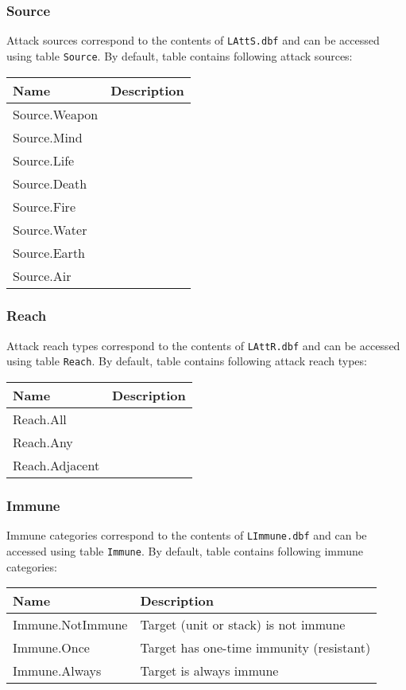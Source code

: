 \subsubsection{Source}
\label{SourceCategory}
Attack sources correspond to the contents of \texttt{LAttS.dbf} and can be accessed using table \texttt{Source}.
By default, table contains following attack sources:\\
\begin{tabularx}{\linewidth}{| l | X |}
\hline
\textbf{Name} & \textbf{Description} \\
\hline
Source.Weapon &\\
\hline
Source.Mind &\\
\hline
Source.Life &\\
\hline
Source.Death &\\
\hline
Source.Fire &\\
\hline
Source.Water &\\
\hline
Source.Earth &\\
\hline
Source.Air &\\
\hline
\end{tabularx}

\subsubsection{Reach}
\label{ReachCategory}
Attack reach types correspond to the contents of \texttt{LAttR.dbf} and can be accessed using table \texttt{Reach}.
By default, table contains following attack reach types:\\
\begin{tabularx}{\linewidth}{| l | X |}
\hline
\textbf{Name} & \textbf{Description} \\
\hline
Reach.All &\\
\hline
Reach.Any &\\
\hline
Reach.Adjacent &\\
\hline
\end{tabularx}

\subsubsection{Immune}
\label{ImmuneCategory}
Immune categories correspond to the contents of \texttt{LImmune.dbf} and can be accessed using table \texttt{Immune}.
By default, table contains following immune categories:\\
\begin{tabularx}{\linewidth}{| l | X |}
\hline
\textbf{Name} & \textbf{Description} \\
\hline
Immune.NotImmune & Target (unit or stack) is not immune\\
\hline
Immune.Once & Target has one-time immunity (resistant)\\
\hline
Immune.Always & Target is always immune\\
\hline
\end{tabularx}

